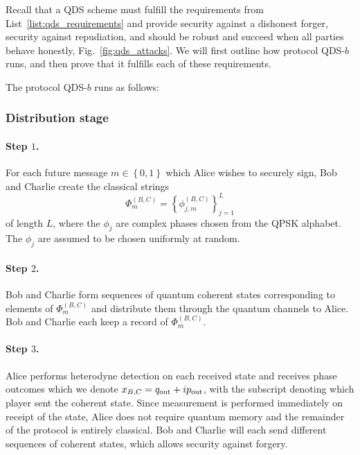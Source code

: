 Recall that a QDS scheme must fulfill the requirements from List~\ref{list:qds_requirements} and provide security against a dishonest forger, security against repudiation, and should be robust and succeed when all parties behave honestly, Fig.~\ref{fig:qds_attacks}. We will first outline how protocol QDS-$b$ runs, and then prove that it fulfills each of these requirements.

The protocol QDS-$b$ runs as follows:

\subsubsection*{Distribution stage}

\paragraph{Step $1$.}
For each future message $m \in \left\{0, 1\right\}$ which Alice wishes to securely sign, Bob and Charlie create the classical strings
\begin{equation}
\Phi_m^{\left(B, C\right)} = \left\{\phi_{j, m}^{\left(B, C\right)}\right\}_{j=1}^L
\end{equation}
of length $L$, where the $\phi_j$ are complex phases chosen from the QPSK alphabet. The $\phi_j$ are assumed to be chosen uniformly at random.


\paragraph{Step $2$.} Bob and Charlie form sequences of quantum coherent states corresponding to elements of $\Phi_m^{\left(B, C\right)}$ and distribute them through the quantum channels to Alice. Bob and Charlie each keep a record of $\Phi_m^{\left(B, C\right)}$.

\paragraph{Step $3$.} Alice performs heterodyne detection on each received state and receives phase outcomes which we denote $x_{B, C} = q_{\text{out}} + i p_{\text{out}}$, with the subscript denoting which player sent the coherent state. Since measurement is performed immediately on receipt of the state, Alice does not require quantum memory and the remainder of the protocol is entirely classical. Bob and Charlie will each send different sequences of coherent states, which allows security against forgery.

